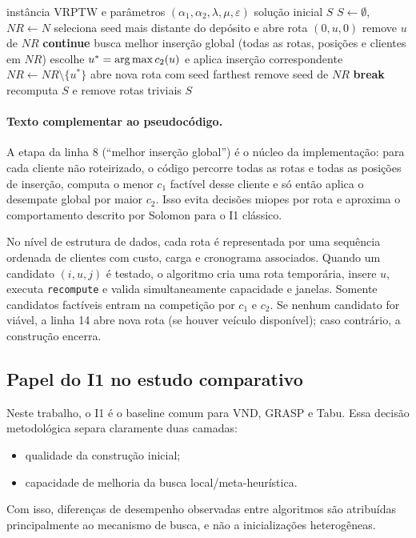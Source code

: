 \begin{algorithm}[htbp]
\caption{Solomon I1}
\label{alg:i1}
\begin{algorithmic}[1]
\Require instância VRPTW e parâmetros $(\alpha_1,\alpha_2,\lambda,\mu,\varepsilon)$
\Ensure solução inicial $S$
\State $S\leftarrow\emptyset$, $NR\leftarrow N$
    \State seleciona seed mais distante do depósito e abre rota $(0,u,0)$
    \State remove $u$ de $NR$
    \State \textbf{continue}
  \EndIf
  \State busca melhor inserção global (todas as rotas, posições e clientes em $NR$)
    \State escolhe $u^*=\operatorname*{arg\,max} c_2(u)$ e aplica inserção correspondente
    \State $NR\leftarrow NR\setminus\{u^*\}$
  \Else
      \State abre nova rota com seed farthest
      \State remove seed de $NR$
    \Else
      \State \textbf{break}
    \EndIf
  \EndIf
\EndWhile
\State recomputa $S$ e remove rotas triviais
\State \Return $S$
\end{algorithmic}
\end{algorithm}

\paragraph{Texto complementar ao pseudocódigo.}
A etapa da linha 8 (``melhor inserção global'') é o núcleo da implementação: para cada cliente não roteirizado, o código percorre todas as rotas e todas as posições de inserção, computa o menor $c_1$ factível desse cliente e só então aplica o desempate global por maior $c_2$.
Isso evita decisões miopes por rota e aproxima o comportamento descrito por Solomon para o I1 clássico.

No nível de estrutura de dados, cada rota é representada por uma sequência ordenada de clientes com custo, carga e cronograma associados.
Quando um candidato $(i,u,j)$ é testado, o algoritmo cria uma rota temporária, insere $u$, executa \texttt{recompute} e valida simultaneamente capacidade e janelas.
Somente candidatos factíveis entram na competição por $c_1$ e $c_2$.
Se nenhum candidato for viável, a linha 14 abre nova rota (se houver veículo disponível); caso contrário, a construção encerra.

\subsection{Papel do I1 no estudo comparativo}

Neste trabalho, o I1 é o baseline comum para VND, GRASP e Tabu.
Essa decisão metodológica separa claramente duas camadas:
\begin{itemize}
  \item qualidade da construção inicial;
  \item capacidade de melhoria da busca local/meta-heurística.
\end{itemize}

Com isso, diferenças de desempenho observadas entre algoritmos são atribuídas principalmente ao mecanismo de busca, e não a inicializações heterogêneas.
